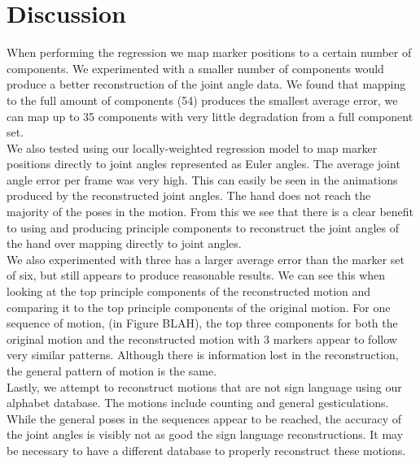 
\section{Discussion}

When performing the regression we map marker positions to a
certain number of components. We experimented with a smaller 
number of components would produce a better
reconstruction of the joint angle data. We found that mapping
to the full amount of components (54) produces the smallest
average error,
we can map up to 35 components with very little degradation
from a full component set.\\

We also tested using our locally-weighted
regression model to map marker positions directly to joint angles
represented as Euler angles. The average joint angle error per
frame was very high. This can easily be seen in the animations
produced by the reconstructed joint angles. The hand does not
reach the majority of the poses in the motion. From this we see
that there is a clear benefit to using and producing principle
components to reconstruct the joint angles of the hand over 
mapping directly to joint angles.\\

We also experimented with
 three has a larger average error than the marker
set of six, but still appears to produce reasonable results. We
can see this when looking at the top principle components of the
reconstructed motion and comparing it to the top principle 
components of the original motion. For one sequence of motion,
(in Figure BLAH), the top three components for both the original
motion and the reconstructed motion with 3 markers appear to follow
very similar patterns. Although there is information lost in the
reconstruction, the general pattern of motion is the same.\\

Lastly, we attempt to reconstruct motions that are not sign language
using our alphabet database. The motions include counting and general
gesticulations. While the general poses in the 
sequences appear to be reached, the accuracy of the joint angles
is visibly not as good the sign language reconstructions. It
may be necessary to have a different database to properly reconstruct
these motions.\\